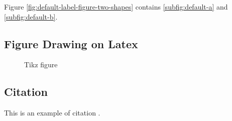 \documentclass[
	11pt
] {article}
\begin{document}
		Figure \ref{fig:default-label-figure-two-shapes} contains \ref{subfig:default-a} and \ref{subfig:default-b}.

	\subsection{Figure Drawing on Latex}
		\begin{figure}[H]
			\centering
			\caption{Tikz figure}
		\end{figure}

	\subsection{Citation}
		This is an example of citation \cite{ramstad2019pore}.



\end{document}
